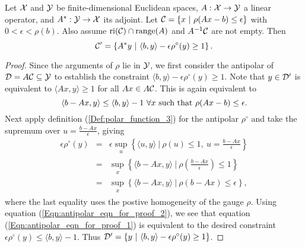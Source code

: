 \begin{enumerate}
\begin{prop}		\label{Prop:antipolar_of_primal_phase_retrieval}
Let ${\mathcal X}$ and ${\mathcal Y}$ be finite-dimensional Euclidean spaces, $A : {\mathcal X} \rightarrow {\mathcal Y}$ a linear operator, and $A^* : {\mathcal Y} \rightarrow {\mathcal X}$ its adjoint.  Let ${\mathcal C} = \{ x \ | \ \rho(Ax-b) \leq \epsilon \}$ with $0 < \epsilon < \rho(b)$.  Also assume $\textnormal{ri}({\mathcal C}) \cap \textnormal{range}(A)$ and $A^{-1}{\mathcal C}$ are not empty. Then
\begin{equation}			\label{Eqn:antipolar_of_primal_phase_retrieval}
{\mathcal C}' = \left\{ A^*y \ | \ \langle b, y \rangle - \epsilon \rho^\circ(y) \geq 1  \right\}.	
\end{equation}
\end{prop}
\begin{proof}
Since the arguments of $\rho$ lie in ${\mathcal Y}$, we first consider the antipolar of ${\mathcal D} = A{\mathcal C} \subseteq {\mathcal Y}$ to establish the constraint $\langle b, y \rangle - \epsilon \rho^\circ(y) \geq 1$.  Note that $y \in {\mathcal D}'$ is equivalent to $\langle Ax, y \rangle \geq 1$ for all $Ax \in A{\mathcal C}$.  This is again equivalent to
\begin{equation}				\label{Eqn:antipolar_eqn_for_proof_1}
\langle b - Ax, y \rangle \leq \langle b, y \rangle - 1 \ \forall x \ \textnormal{such that} \ \rho(Ax-b) \leq \epsilon.
\end{equation}
Next apply definition (\ref{Def:polar_function_3}) for the antipolar $\rho^\circ$ and take the supremum over $u = \frac{b-Ax}{\epsilon}$, giving 
\begin{equation}  		\label{Eqn:antipolar_eqn_for_proof_2}
\begin{array}{lll}
\epsilon \rho^\circ(y) 	&	=	&	\epsilon \sup\limits_{\substack{u}} \left\{ \langle u, y \rangle \ | \ \rho(u) \leq 1, \ u = \frac{b-Ax}{\epsilon}  \right\} 	\\
	&	= 	&  \sup\limits_{\substack{x}} \left\{ \langle b - Ax, y \rangle \ | \ \rho\left(\frac{b-Ax}{\epsilon}\right) \leq 1  \right\} \\
		&	= 	&  \sup\limits_{\substack{x}} \left\{ \langle b - Ax, y \rangle \ | \ \rho(b-Ax) \leq \epsilon  \right\},
\end{array}
\end{equation}
where the last equality uses the postive homogeneity of the gauge $\rho$.  Using equation (\ref{Eqn:antipolar_eqn_for_proof_2}), we see that equation (\ref{Eqn:antipolar_eqn_for_proof_1}) is equivalent to the desired constraint $\epsilon \rho^\circ(y) \leq  \langle b, y \rangle - 1$.  Thus ${\mathcal D}' = \{ y \ | \ \langle b, y \rangle - \epsilon \rho^\circ(y) \geq 1 \}$.


\end{proof}
\end{enumerate}
